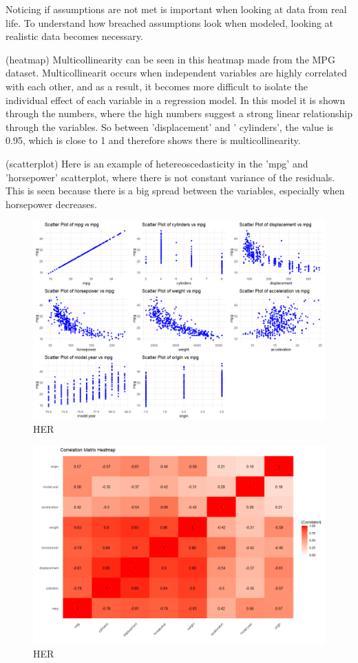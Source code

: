Noticing if assumptions are not met is important when looking at data from real life.
To understand how breached assumptions look when modeled, looking at realistic data becomes necessary. \newline

(heatmap)
Multicollinearity can be seen in this heatmap made from the MPG dataset. Multicollinearit occurs when independent variables are highly correlated with each other, and as a result, it becomes more difficult to isolate the individual effect of each variable in a regression model.
In this model it is shown through the numbers, where the high numbers suggest a strong linear relationship through the variables. So between 'displacement' and ' cylinders', the value is 0.95, which is close to 1 and therefore shows there is multicollinearity. \newline

(scatterplot)
Here is an example of hetereoscedasticity in the 'mpg' and 'horsepower' scatterplot, where there is not constant variance of the residuals. This is seen because there is a big spread between the variables, especially when horsepower decreases.   


\begin{figure}
		\centering
\includegraphics[width=\linewidth]{billder/2.png}
\caption{HER}
\label{fig:Scatter}
\end{figure}

\begin{figure}
	\centering
	\includegraphics[width=\linewidth]{billder/1.png}
	\caption{HER}
	\label{fig:HEAT}
\end{figure}